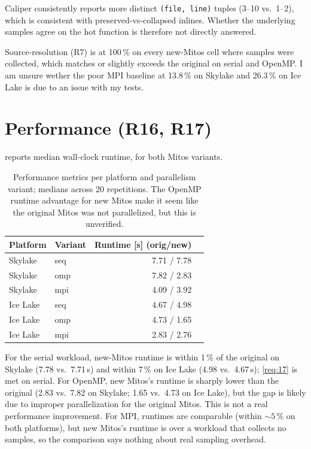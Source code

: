 Caliper consistently reports more distinct \texttt{(file,\,line)} tuples (3--10 vs.\ 1--2), which is consistent with preserved-vs-collapsed inlines. Whether the underlying samples agree on the hot function is therefore not directly answered.

Source-resolution (R7) is at 100\,\% on every new-Mitos cell where samples were collected, which matches or slightly exceeds the original on serial and OpenMP. I am unsure wether the poor MPI baseline at 13.8\,\% on Skylake and 26.3\,\% on Ice Lake is due to an issue with my tests.

\section{Performance (R16, R17)}\label{sec:eval-performance}

 reports median wall-clock runtime, for both Mitos variants.

\begin{table}[h]
    \centering
    \small
    \begin{tabular}{@{}llrr@{}}
        \textbf{Platform} & \textbf{Variant} & \textbf{Runtime [s] (orig/new)} \\
        \hline
        Skylake           & seq              & 7.71 / 7.78                     \\
        Skylake           & omp              & 7.82 / 2.83                     \\
        Skylake           & mpi              & 4.09 / 3.92                     \\
        Ice Lake          & seq              & 4.67 / 4.98                     \\
        Ice Lake          & omp              & 4.73 / 1.65                     \\
        Ice Lake          & mpi              & 2.83 / 2.76                     \\
    \end{tabular}
    \caption{Performance metrics per platform and parallelism variant; medians across 20 repetitions. The OpenMP runtime advantage for new Mitos make it seem like the original Mitos was not parallelized, but this is unverified.}
    \label{tab:eval-performance}
\end{table}

For the serial workload, new-Mitos runtime is within 1\,\% of the original on Skylake (7.78 vs.\ 7.71\,s) and within 7\,\% on Ice Lake (4.98 vs.\ 4.67\,s); \ref{req:17} is met on serial. For OpenMP, new Mitos's runtime is sharply lower than the original (2.83 vs.\ 7.82 on Skylake; 1.65 vs.\ 4.73 on Ice Lake), but the gap is likely due to improper parallelization for the original Mitos. This is not a real performance improvement. For MPI, runtimes are comparable (within ${\sim}5\,\%$ on both platforms), but new Mitos's runtime is over a workload that collects no samples, so the comparison says nothing about real sampling overhead.

